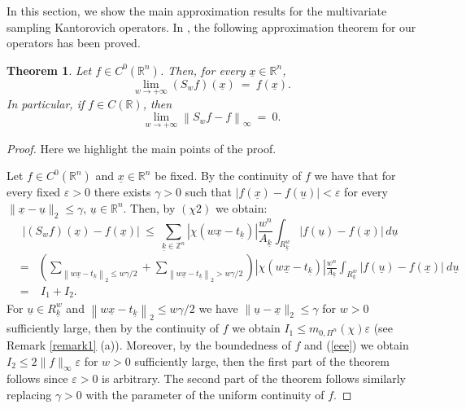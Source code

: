 \documentclass[11pt,a4paper]{article}
\newcommand{\miu}{\leq}
\newcommand{\ep}{\varepsilon}
\newcommand{\R}{\mathbb{R}}
\newcommand{\Z}{\mathbb{Z}}
\newcommand{\kk}{\underline{k}}
\newcommand{\tk}{t_{\underline{k}}}
\newcommand{\uu}{\underline{u}}
\newcommand{\xx}{\underline{x}}
\newtheorem{theorem}[definition]{Theorem}
\begin{document}
In this section, we show the main approximation results for the multivariate sampling Kantorovich operators. In \cite{COVI}, the following approximation theorem for our operators has been proved. 
\begin{theorem} \label{th1}
Let $f \in C^0(\R^n)$. Then, for every $\underline{x} \in \R^n$,
\begin{displaymath}
\lim_{w \to +\infty} (S_w f)(\underline{x})\ =\ f(\underline{x}).
\end{displaymath}
In particular, if $f \in C(\R)$, then
\begin{displaymath}
\lim_{w \to +\infty} \left\|S_w f -f\right\|_{\infty}\ =\ 0.
\end{displaymath}
\end{theorem}
\begin{proof}
Here we highlight the main points of the proof.

\noindent Let $f \in C^0(\R^n)$ and $\xx \in \R^n$ be fixed. By the continuity of $f$ we have that for every fixed $\ep>0$ there exists $\gamma>0$ such that $|f(\xx)-f(\uu)|<\ep$ for every $\| \xx -\uu\|_2 \miu \gamma$, $\uu \in \R^n$. Then, by $(\chi 2)$ we obtain:
$$
\left|(S_w f)(\xx)-f(\xx)\right|\ \miu\ \sum_{\kk \in \Z^n} \left|\chi(w \xx - \tk)\right| \frac{w^n}{A_{\kk}}\int_{R^w_{\kk}}\left|f(\uu)-f(\xx)\right|\, d\uu\ 
$$
\vskip-0.5cm
\begin{eqnarray*}
&=& (\sum_{\left\|w \xx-\tk\right\|_2 \miu w \gamma/2}+\sum_{\left\|w \xx-\tk\right\|_2 > w \gamma/2})\left|\chi(w \xx - \tk)\right|\frac{w^n}{A_{\kk}}\int_{R^w_{\kk}}\left|f(\uu)-f(\xx)\right|\ d\uu \\
&=&\ I_1+I_2.
\end{eqnarray*}
For $\uu \! \in \! R^w_{\kk}$ and $\left\|w \xx-\tk\right\|_2\! \miu \! w \gamma/2$ we have $\|\uu-\xx\|_2\! \miu \! \gamma$ for  $w\! > \!0$ sufficiently large, then by the continuity of $f$ we obtain $I_1 \miu m_{0,\Pi^n}(\chi) \ep$ (see Remark \ref{remark1} (a)). Moreover, by the boundedness of $f$ and (\ref{eee}) we obtain $I_2 \miu 2\|f\|_{\infty} \ep$ for $w>0$ sufficiently large, then the first part of the theorem follows since $\ep>0$ is arbitrary. The second part of the theorem follows similarly replacing $\gamma>0$ with the parameter of the uniform continuity of $f$. 
\end{proof}
\end{document}
